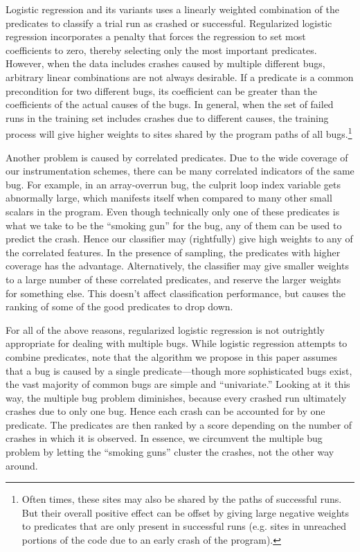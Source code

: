 Logistic regression and its variants uses a linearly weighted
combination of the predicates to classify a trial run as crashed or
successful.  Regularized logistic regression incorporates a penalty
that forces the regression to set most coefficients to zero, thereby
selecting only the most important predicates.  However, when the data
includes crashes caused by multiple different bugs, arbitrary linear
combinations are not always desirable.  If a predicate is a
common precondition for two different bugs, its coefficient
can be greater than the coefficients of the actual causes of the bugs.
In general, when the set of failed runs in
the training set includes crashes due to different causes, the
training process will give higher weights to sites shared by the
program paths of all bugs.\footnote{Often times, these sites may also be
shared by the paths of successful runs.  But their overall positive
effect can be offset by giving large negative weights to predicates
that are only present in successful runs (e.g. sites in unreached
portions of the code due to an early crash of the program).}

Another problem is caused by correlated predicates.
Due to the wide coverage of our instrumentation schemes, there can be
many correlated indicators of the same bug.  For example, in an
array-overrun bug, the culprit loop index variable gets abnormally
large, which manifests itself when compared to many other small
scalars in the program.  Even though technically only one of these
predicates is what we take to be the ``smoking gun'' for the bug, any
of them can be used to predict the crash.  Hence our classifier may
(rightfully) give high weights to any of the correlated features.  In
the presence of sampling, the predicates with higher coverage has the
advantage.  Alternatively, the classifier may give smaller
weights to a large number of these correlated predicates, and reserve
the larger weights for something else.  This doesn't affect
classification performance, but causes the ranking of
some of the good predicates to drop down.

For all of the above reasons, regularized logistic regression is not
outrightly appropriate for dealing with multiple bugs.  While logistic
regression attempts to combine predicates, note that the algorithm we
propose in this paper assumes that a bug is caused by a single
predicate---though more sophisticated bugs exist, the vast majority of
common bugs are simple and ``univariate.''  Looking at it this way,
the multiple bug problem diminishes, because every crashed run
ultimately crashes due to only one bug.  Hence each crash can be
accounted for by one predicate.  The predicates are then ranked by a
score depending on the number of crashes in which it is observed.  In
essence, we circumvent the multiple bug problem by letting the
``smoking guns'' cluster the crashes, not the other way around.

